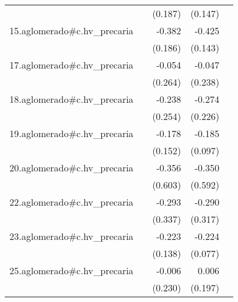 {\begin{longtable}{l*{4}{D{.}{.}{-1}}}
            &                     &     (0.187)         &     (0.147)         &                     \\
\addlinespace
15.aglomerado#c.hv\_precaria&                     &      -0.382\sym{*}  &      -0.425\sym{**} &                     \\
            &                     &     (0.186)         &     (0.143)         &                     \\
\addlinespace
17.aglomerado#c.hv\_precaria&                     &      -0.054         &      -0.047         &                     \\
            &                     &     (0.264)         &     (0.238)         &                     \\
\addlinespace
18.aglomerado#c.hv\_precaria&                     &      -0.238         &      -0.274         &                     \\
            &                     &     (0.254)         &     (0.226)         &                     \\
\addlinespace
19.aglomerado#c.hv\_precaria&                     &      -0.178         &      -0.185         &                     \\
            &                     &     (0.152)         &     (0.097)         &                     \\
\addlinespace
20.aglomerado#c.hv\_precaria&                     &      -0.356         &      -0.350         &                     \\
            &                     &     (0.603)         &     (0.592)         &                     \\
\addlinespace
22.aglomerado#c.hv\_precaria&                     &      -0.293         &      -0.290         &                     \\
            &                     &     (0.337)         &     (0.317)         &                     \\
\addlinespace
23.aglomerado#c.hv\_precaria&                     &      -0.223         &      -0.224\sym{**} &                     \\
            &                     &     (0.138)         &     (0.077)         &                     \\
\addlinespace
25.aglomerado#c.hv\_precaria&                     &      -0.006         &       0.006         &                     \\
            &                     &     (0.230)         &     (0.197)         &                     \\

\end{longtable}}
